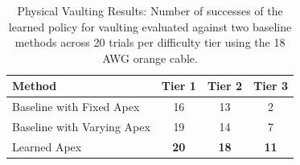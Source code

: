 \begin{table}[t]
\vspace*{0pt}
\centering
\caption{Physical Vaulting Results: Number of successes of the learned policy for vaulting evaluated against two baseline methods across 20 trials per difficulty tier using the 18 AWG orange cable.}
 \begin{tabular}{ 
l c c c}
 \toprule
  Method & Tier 1 & Tier 2 & Tier 3\\
  \midrule
  Baseline with Fixed Apex&16&13&2\\
  Baseline with Varying Apex&19&14&7\\
  Learned Apex &\textbf{20}&\textbf{18}&\textbf{11}\\
 \bottomrule
\end{tabular}

\label{table:res_task1}
\end{table}